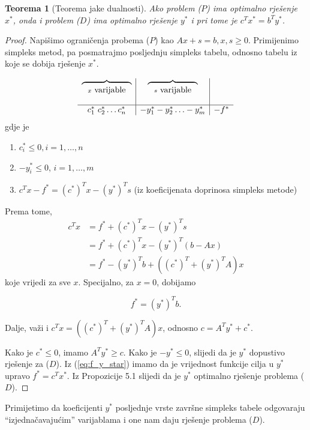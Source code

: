 \documentclass[a4paper, utf8, 11pt, colorlinks]{book}
\newtheorem{thm}{Teorema}[chapter]
\theoremstyle{definition}
\begin{document}
\begin{thm}[Teorema jake dualnosti]
     Ako problem ($P$) ima optimalno rješenje $x^*$, onda i problem ($D$) ima optimalno rješenje $y^*$ i pri tome je $c^T x^* = b^T y^*$.
\end{thm}
\begin{proof}
         Napišimo ograničenja probema ($P$) kao $Ax + s = b, x, s \geq 0$.
         Primijenimo simpleks metod, pa posmatrajmo posljednju  simpleks tabelu, odnosno tabelu iz koje se dobija rješenje $x^*$.
         
         $$\begin{array}{c |c | c}
         \overbrace{\ \ \ \ \ \hspace{1.5cm}}_{x \mbox{ varijable}}     &  \overbrace{\ \ \ \ \ \hspace{1.5cm}}_{s \mbox{ varijable}} &   \\
                                                           & &   \\
         \hline
             c_1^*\ c_2^* \ldots c_n^*            & -y_1^* -y_2^* \ldots -y_m^*  & -f^*
         \end{array}
         $$
   gdje je 
   \begin{enumerate}
       \item    $c^*_i \leq 0, i = 1,\ldots, n$ 
       \item    $-y_i^* \leq 0$, $i = 1,\ldots, m$
       \item  $c^T x - f^* = (c^*)^T x - (y^*)^T s$ (iz koeficijenata doprinosa simpleks metode)
    \end{enumerate}
    Prema tome, 
    \begin{align*}
           c^T x &=  f^* + (c^*)^T x - (y^*)^T s \\
                 &=  f^* + (c^*)^T x - (y^*)^T (b - Ax) \\
                 &= f^*  - (y^*)^T b +   ((c^*)^T + (y^*)^T A ) x
    \end{align*}
    koje vrijedi za sve $x$. Specijalno, za  $x = 0$,  dobijamo 
    
    \begin{equation}\label{eq:f_y_star}
        f^* = (y^*)^T b.
    \end{equation}

Dalje, važi i $c^T x = ((c^*)^T + (y^*)^T A ) x$, odnosno     $ c = A^T y^* + c^*$. 
    
    Kako je $c^* \leq 0$, imamo  $A^T y^* \geq c$. Kako je $-y^* \leq 0$, slijedi da je $y^*$ dopustivo rješenje za  ($D$).  Iz (\ref{eq:f_y_star}) imamo da je vrijednost funkcije cilja u $y^*$ upravo $f^* = c^T x^* $. Iz Propozicije 5.1  slijedi da je $y^*$ optimalno rješenje problema  ($D$). 
 
    
\end{proof} 
Primijetimo da koeficijenti $y^*$ posljednje vrste završne simpleks tabele odgovaraju  ``izjednačavajućim''   varijablama i one nam daju rješenje problema  ($D$).  
\end{document}
